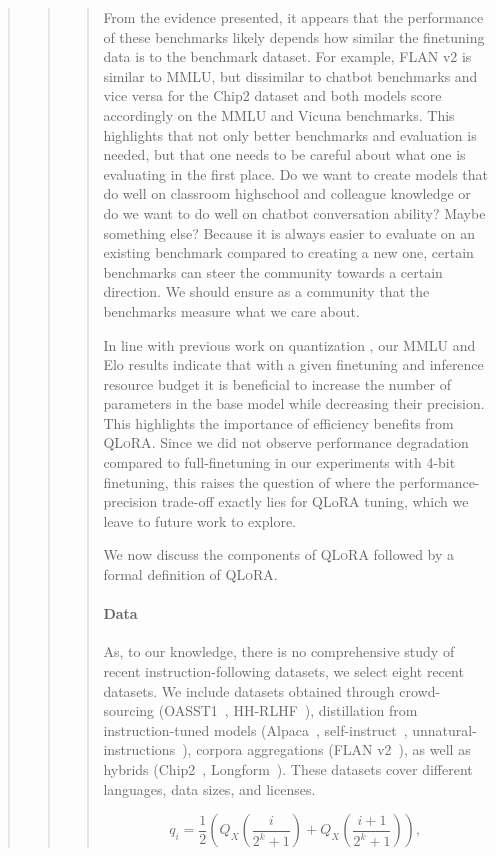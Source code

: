 \begin{quote}
\begin{quote}
\begin{quote}
From the evidence presented, it appears that the performance of these benchmarks likely depends how similar the finetuning data is to the benchmark dataset. For example, FLAN v2 is similar to MMLU, but dissimilar to chatbot benchmarks and vice versa for the Chip2 dataset and both models score accordingly on the MMLU and Vicuna benchmarks. This highlights that not only better benchmarks and evaluation is needed, but that one needs to be careful about what one is evaluating in the first place. Do we want to create models that do well on classroom highschool and colleague knowledge or do we want to do well on chatbot conversation ability? Maybe something else? Because it is always easier to evaluate on an existing benchmark compared to creating a new one, certain benchmarks can steer the community towards a certain direction. We should ensure as a community that the benchmarks measure what we care about. 

In line with previous work on quantization \citep{dettmers2022case}, our MMLU and Elo results indicate that with a given finetuning and inference resource budget it is beneficial to increase the number of parameters in the base model while decreasing their precision. This highlights the importance of efficiency benefits from \textsc{QLoRA}. Since we did not observe performance degradation compared to full-finetuning in our experiments with 4-bit finetuning, this raises the question of where the performance-precision trade-off exactly lies for QLoRA tuning, which we leave to future work to explore.

We now discuss the components of \textsc{QLoRA} followed by a formal definition of \textsc{QLoRA}.

\paragraph{Data} As, to our knowledge, there is no comprehensive study of recent instruction-following datasets, we select eight recent datasets. We include datasets obtained through crowd-sourcing (OASST1~\citep{kopf2023openassistant}, HH-RLHF~\citep{bai2022training}), distillation from instruction-tuned models (Alpaca~\citep{alpaca}, self-instruct~\citep{wang2022self}, unnatural-instructions~\citep{honovich2022unnatural}), corpora aggregations (FLAN v2~\citep{chung2022scaling}), as well as hybrids (Chip2~\citep{laion2023}, Longform~\citep{koksal2023longform}). These datasets cover different languages, data sizes, and licenses. 

\begin{equation}
q_i  = \frac{1}{2}\left( Q_X\left(\frac{i}{2^k+1}\right) + Q_X\left(\frac{i+1}{2^k+1}\right)\right),
\end{equation}


\end{quote}
\end{quote}
\end{quote}
